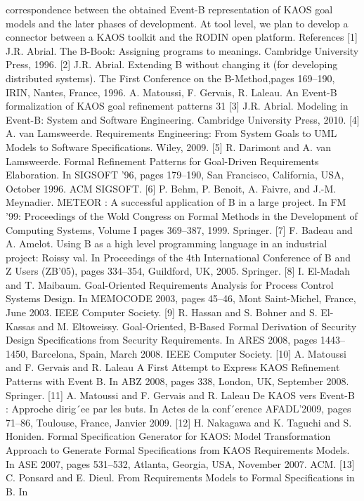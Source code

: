 correspondence between the obtained Event-B representation of KAOS goal models and the
later phases of development. At tool level, we plan to develop a connector between a KAOS
toolkit and the RODIN open platform.
References
[1] J.R. Abrial. The B-Book: Assigning programs to meanings. Cambridge University Press,
1996.
[2] J.R. Abrial. Extending B without changing it (for developing distributed systems). The
First Conference on the B-Method,pages 169–190, IRIN, Nantes, France, 1996.
A. Matoussi, F. Gervais, R. Laleau. An Event-B formalization of KAOS goal refinement patterns 31
[3] J.R. Abrial. Modeling in Event-B: System and Software Engineering. Cambridge University Press, 2010.
[4] A. van Lamsweerde. Requirements Engineering: From System Goals to UML Models to
Software Specifications. Wiley, 2009.
[5] R. Darimont and A. van Lamsweerde. Formal Refinement Patterns for Goal-Driven
Requirements Elaboration. In SIGSOFT ’96, pages 179–190, San Francisco, California,
USA, October 1996. ACM SIGSOFT.
[6] P. Behm, P. Benoit, A. Faivre, and J.-M. Meynadier. METEOR : A successful application
of B in a large project. In FM ’99: Proceedings of the Wold Congress on Formal Methods
in the Development of Computing Systems, Volume I pages 369–387, 1999. Springer.
[7] F. Badeau and A. Amelot. Using B as a high level programming language in an industrial
project: Roissy val. In Proceedings of the 4th International Conference of B and Z Users
(ZB’05), pages 334–354, Guildford, UK, 2005. Springer.
[8] I. El-Madah and T. Maibaum. Goal-Oriented Requirements Analysis for Process Control
Systems Design. In MEMOCODE 2003, pages 45–46, Mont Saint-Michel, France, June
2003. IEEE Computer Society.
[9] R. Hassan and S. Bohner and S. El-Kassas and M. Eltoweissy. Goal-Oriented, B-Based
Formal Derivation of Security Design Specifications from Security Requirements. In
ARES 2008, pages 1443–1450, Barcelona, Spain, March 2008. IEEE Computer Society.
[10] A. Matoussi and F. Gervais and R. Laleau A First Attempt to Express KAOS Refinement
Patterns with Event B. In ABZ 2008, pages 338, London, UK, September 2008. Springer.
[11] A. Matoussi and F. Gervais and R. Laleau De KAOS vers Event-B : Approche dirig´ee
par les buts. In Actes de la conf´erence AFADL’2009, pages 71–86, Toulouse, France,
Janvier 2009.
[12] H. Nakagawa and K. Taguchi and S. Honiden. Formal Specification Generator for KAOS:
Model Transformation Approach to Generate Formal Specifications from KAOS Requirements Models. In ASE 2007, pages 531–532, Atlanta, Georgia, USA, November 2007.
ACM.
[13] C. Ponsard and E. Dieul. From Requirements Models to Formal Specifications in B. In
